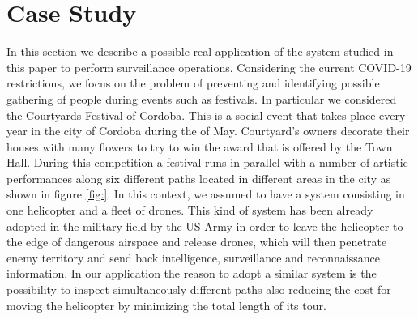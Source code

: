\section{Case Study}
In this section we describe a possible real application of the system studied in this paper to perform surveillance operations. Considering the current COVID-19 restrictions, we focus on the problem of preventing and identifying possible gathering of people during events such as festivals. In particular we considered the Courtyards Festival of Cordoba. This is a social event that takes place every year in the city of Cordoba during the  of May. Courtyard’s owners decorate their houses with many flowers to try to win the award that is offered by the Town Hall. During this competition a festival runs in parallel with a number of artistic performances along six different paths located in different areas in the city as shown in figure \ref{fig:}.
In this context, we assumed to have a system consisting in one helicopter and a fleet of drones.
This kind of system has been already adopted in the military field by the US Army in order to leave the helicopter to the edge of dangerous airspace and release drones, which will then penetrate enemy territory and send back intelligence, surveillance and reconnaissance information.
In our application the reason to adopt a similar system is the possibility to inspect simultaneously different paths also reducing the cost for moving the helicopter by minimizing the total length of its tour.
